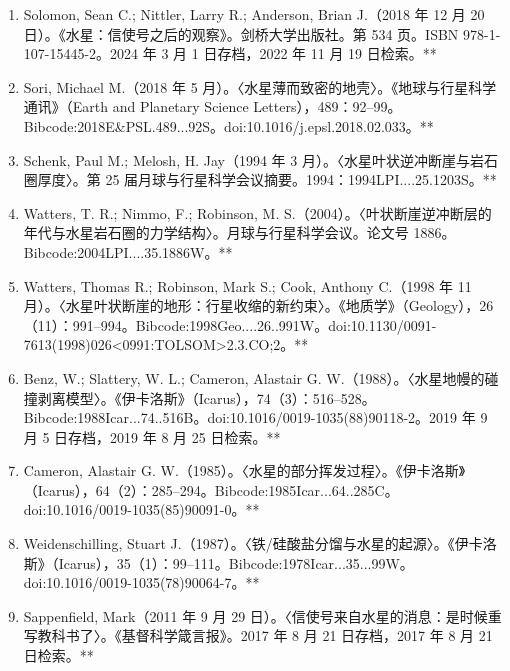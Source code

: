 \begin{enumerate}
    \item Solomon, Sean C.; Nittler, Larry R.; Anderson, Brian J.（2018 年 12 月 20 日）。《水星：信使号之后的观察》。剑桥大学出版社。第 534 页。ISBN 978-1-107-15445-2。2024 年 3 月 1 日存档，2022 年 11 月 19 日检索。**

    \item Sori, Michael M.（2018 年 5 月）。〈水星薄而致密的地壳〉。《地球与行星科学通讯》（Earth and Planetary Science Letters），489：92–99。Bibcode:2018E&PSL.489...92S。doi:10.1016/j.epsl.2018.02.033。**

    \item Schenk, Paul M.; Melosh, H. Jay（1994 年 3 月）。〈水星叶状逆冲断崖与岩石圈厚度〉。第 25 届月球与行星科学会议摘要。1994：1994LPI....25.1203S。**

    \item Watters, T. R.; Nimmo, F.; Robinson, M. S.（2004）。〈叶状断崖逆冲断层的年代与水星岩石圈的力学结构〉。月球与行星科学会议。论文号 1886。Bibcode:2004LPI....35.1886W。**

    \item Watters, Thomas R.; Robinson, Mark S.; Cook, Anthony C.（1998 年 11 月）。〈水星叶状断崖的地形：行星收缩的新约束〉。《地质学》（Geology），26（11）：991–994。Bibcode:1998Geo....26..991W。doi:10.1130/0091-7613(1998)026<0991:TOLSOM>2.3.CO;2。**

    \item Benz, W.; Slattery, W. L.; Cameron, Alastair G. W.（1988）。〈水星地幔的碰撞剥离模型〉。《伊卡洛斯》（Icarus），74（3）：516–528。Bibcode:1988Icar...74..516B。doi:10.1016/0019-1035(88)90118-2。2019 年 9 月 5 日存档，2019 年 8 月 25 日检索。**

    \item Cameron, Alastair G. W.（1985）。〈水星的部分挥发过程〉。《伊卡洛斯》（Icarus），64（2）：285–294。Bibcode:1985Icar...64..285C。doi:10.1016/0019-1035(85)90091-0。**

    \item Weidenschilling, Stuart J.（1987）。〈铁/硅酸盐分馏与水星的起源〉。《伊卡洛斯》（Icarus），35（1）：99–111。Bibcode:1978Icar...35...99W。doi:10.1016/0019-1035(78)90064-7。**

    \item Sappenfield, Mark（2011 年 9 月 29 日）。〈信使号来自水星的消息：是时候重写教科书了〉。《基督科学箴言报》。2017 年 8 月 21 日存档，2017 年 8 月 21 日检索。**


\end{enumerate}
